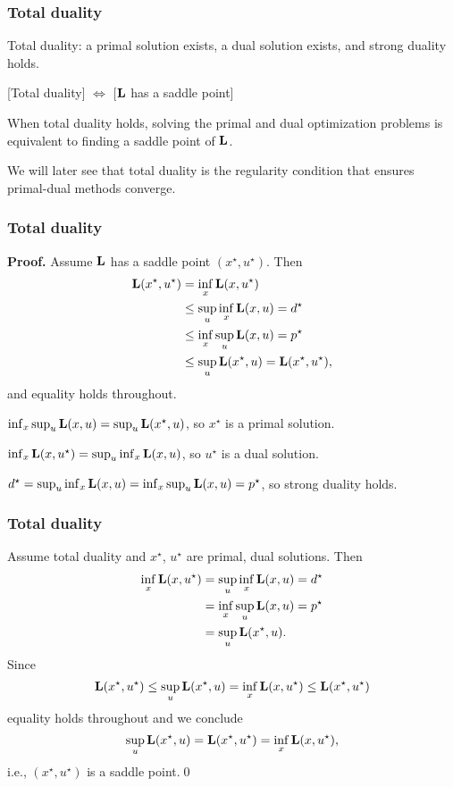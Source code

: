 \documentclass[10pt,mathserif]{beamer}
\begin{document}
\begin{frame}
\frametitle{Total duality}
Total duality: a primal solution exists, a dual solution exists, and strong duality holds.

\vspace{0.2in}

[Total duality] $\Leftrightarrow$ [$\mathbf{L}$ has a saddle point]


\vspace{0.2in}

When total duality holds, 
solving the primal and dual optimization problems
is equivalent to finding a saddle point of $\mathbf{L}$.


\vspace{0.2in}


We will later see that total duality is the regularity condition that ensures primal-dual methods converge.

\end{frame}




\begin{frame}
\frametitle{Total duality}
\textbf{Proof.}
Assume $\mathbf{L}$ has a saddle point $(x^\star,u^\star)$.
Then
\begin{align*}
\mathbf{L}(x^\star,u^\star)
&= \inf_x  \mathbf{L}(x,u^\star)\\
&\le \sup_u \inf_x  \mathbf{L}(x,u)=d^\star\\
&\le \inf_x\sup_u \mathbf{L}(x,u)=p^\star\\
&\le \sup_u \mathbf{L}(x^\star,u)=\mathbf{L}(x^\star,u^\star),
\end{align*}
and equality holds throughout.


\vspace{0.2in}

$\inf_x\sup_u \mathbf{L}(x,u)= \sup_u \mathbf{L}(x^\star,u)$,  so $x^\star$ is a primal solution.

$\inf_x  \mathbf{L}(x,u^\star)=\sup_u \inf_x  \mathbf{L}(x,u)$,  so $u^\star$ is a dual solution.

$d^\star=\sup_u \inf_x  \mathbf{L}(x,u)= \inf_x\sup_u \mathbf{L}(x,u)=p^\star$, so strong duality holds.
\end{frame}



\begin{frame}
\frametitle{Total duality}
Assume total duality and $x^\star$, $u^\star$ are primal, dual solutions. Then
\begin{align*}
 \inf_x  \mathbf{L}(x,u^\star)&= \sup_u \inf_x  \mathbf{L}(x,u)=d^\star\\
&= \inf_x\sup_u \mathbf{L}(x,u)=p^\star\\
&= \sup_u \mathbf{L}(x^\star,u).
\end{align*}
Since
\[
\mathbf{L}(x^\star,u^\star)\le
\sup_u \mathbf{L}(x^\star,u)=
\inf_x  \mathbf{L}(x,u^\star)\le \mathbf{L}(x^\star,u^\star)
\]
equality holds throughout and we conclude
\[
\sup_u \mathbf{L}(x^\star,u)=\mathbf{L}(x^\star,u^\star)=\inf_x  \mathbf{L}(x,u^\star),
\]
i.e., $(x^\star,u^\star)$ is a saddle point.\qed
\end{frame}
\end{document}
